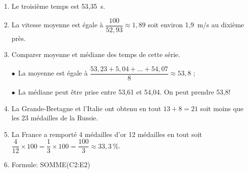 \documentclass[10pt]{article}
\begin{document}
\begin{enumerate}
\item %
Le troisième temps est 53,35~s.
\item %
La vitesse moyenne est égale à $\dfrac{100}{52,93} \approx 1,89$ soit environ 1,9~m/s au dixième près.
\item Comparer moyenne et médiane des temps de cette série.

$\bullet~~$La moyenne est égale à $\dfrac{53,23 + 5,04 + \ldots + 54,07}{8}  \approx 53,8$ ;

$\bullet~~$La médiane peut être prise entre 53,61 et 54,04. On peut prendre 53,8!

\medskip



\item %
La Grande-Bretagne et l'Italie ont obtenu en tout $13 + 8 = 21$ soit moins que les 23 médailles de la Russie.
\item %
La France a remporté 4 médailles d'or 12 médailles en tout soit $\dfrac{4}{12} \times 100 = \dfrac{1}{3} \times 100 = \dfrac{100}{3} \approx 33,3\,\%$.
\item %
Formule: SOMME(C2:E2)

\end{enumerate}

\bigskip
\end{document}
